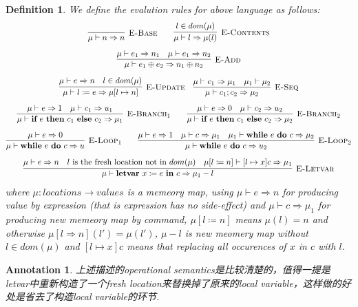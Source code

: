 \documentclass{article}
\newtheorem{definition}[theorem]{Definition}
\newtheorem{annotation}[theorem]{Annotation}
\newcommand*{\xfunc}[4]{{#2}\colon{#3}{#1}{#4}}
\newcommand*{\func}[3]{\xfunc{\to}{#1}{#2}{#3}}
\newcommand{\ifelse}[3]{\ensuremath{\textbf{if}~#1~\textbf{then}~#2~\textbf{else}~#3}}
\newcommand{\newwhiledo}[2]{\ensuremath{\textbf{while}~#1~\textbf{do}~#2}}
\newcommand{\letvar}[2]{\ensuremath{\textbf{letvar}~#1~\textbf{in}~#2}}
\begin{document}
\begin{definition}
\rm We define the evalution rules for above language as follows:
\[
	\begin{gathered}
	\infer[\textsc{E-Base}]{\mu \vdash n \Rightarrow n}{} \quad\quad \infer[\textsc{E-Contents}]{\mu \vdash l \Rightarrow \mu(l)}{l \in dom(\mu)} \\[0.5em]
	\infer[\textsc{E-Add}]{\mu \vdash e_1 \oplus e_2 \Rightarrow n_1 \oplus n_2}{\mu \vdash e_1 \Rightarrow n_1 & \mu \vdash e_1 \Rightarrow n_2} \\[0.5em]
	\infer[\textsc{E-Update}]{\mu \vdash l \coloneqq e \Rightarrow \mu[l \mapsto n]}{\mu \vdash e \Rightarrow n & l \in dom(\mu)} \quad \infer[\textsc{E-Seq}]{\mu \vdash c_1;c_2 \Rightarrow \mu_2}{\mu \vdash c_1 \Rightarrow \mu_1 & \mu_1 \vdash \mu_2} \\[0.5em]
	\infer[\textsc{E-Branch}_1]{\mu \vdash \ifelse{e}{c_1}{c_2} \Rightarrow \mu_1}{\mu \vdash e \Rightarrow 1 & \mu \vdash c_1 \Rightarrow u_1} \quad\quad \infer[\textsc{E-Branch}_2]{\mu \vdash \ifelse{e}{c_1}{c_2} \Rightarrow \mu_2}{\mu \vdash e \Rightarrow 0 & \mu \vdash c_2 \Rightarrow u_2} \\[0.5em]
	\infer[\textsc{E-Loop}_1]{\mu \vdash \newwhiledo{e}{c} \Rightarrow u}{\mu \vdash e \Rightarrow 0} \quad\quad \infer[\textsc{E-Loop}_2]{\mu \vdash \newwhiledo{e}{c} \Rightarrow u_2}{\mu \vdash e \Rightarrow 1 & \mu \vdash c \Rightarrow \mu_1 & \mu_1 \vdash \newwhiledo{e}{c} \Rightarrow \mu_2}\\[0.5em]
	\infer[\textsc{E-Letvar}]{\mu \vdash \letvar{x \coloneqq e}{c} \Rightarrow \mu_1-l}{\mu \vdash e \Rightarrow n & \text{$l$ is the fresh location not in $dom(\mu)$} & \mu[l \coloneqq n] \vdash [l \mapsto x]c \Rightarrow \mu_1}
	\end{gathered}
\]
where $\func{\mu}{locations}{values}$ is a memeory map, using $\mu \vdash e \Rightarrow n$ for producing value by expression (that is expression has no side-effect) and $\mu \vdash c \Rightarrow \mu_1$ for producing new memeory map by command, $\mu[l \coloneqq n]$ means $\mu(l) = n$ and otherwise $\mu[l \Rightarrow n](l') = \mu(l')$, $\mu-l$ is new meomery map without $l \in dom(\mu)$ and $[l \mapsto x]c$ means that replacing all occurences of $x$ in $c$ with $l$.
\end{definition}

\begin{annotation}
\rm 上述描述的operational semantics是比较清楚的，值得一提是letvar中重新构造了一个fresh location来替换掉了原来的local variable，这样做的好处是省去了构造local variable的环节. 
\end{annotation}
\end{document}
